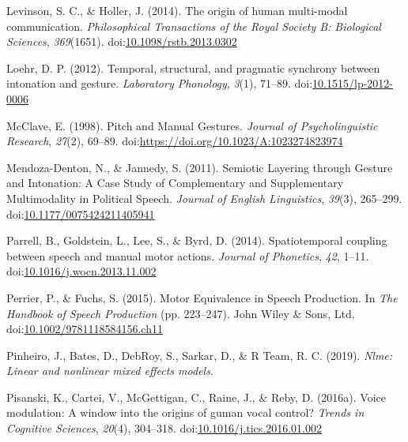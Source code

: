 \documentclass[
  man, noextraspace,floatsintext]{apa6}
\newlength{\cslhangindent}
\newenvironment{cslreferences}%
  {\setlength{\parindent}{0pt}%
  \everypar{\setlength{\hangindent}{\cslhangindent}}\ignorespaces}%
  {\par}
\begin{document}
\begin{cslreferences}
\leavevmode\hypertarget{ref-levinsonOriginHumanMultimodal2014}{}%
Levinson, S. C., \& Holler, J. (2014). The origin of human multi-modal communication. \emph{Philosophical Transactions of the Royal Society B: Biological Sciences}, \emph{369}(1651). doi:\href{https://doi.org/10.1098/rstb.2013.0302}{10.1098/rstb.2013.0302}

\leavevmode\hypertarget{ref-loehrTemporalStructuralPragmatic2012}{}%
Loehr, D. P. (2012). Temporal, structural, and pragmatic synchrony between intonation and gesture. \emph{Laboratory Phonology}, \emph{3}(1), 71--89. doi:\href{https://doi.org/10.1515/lp-2012-0006}{10.1515/lp-2012-0006}

\leavevmode\hypertarget{ref-mcclavePitchManualGestures1998}{}%
McClave, E. (1998). Pitch and Manual Gestures. \emph{Journal of Psycholinguistic Research}, \emph{27}(2), 69--89. doi:\href{https://doi.org/https://doi.org/10.1023/A:1023274823974}{https://doi.org/10.1023/A:1023274823974}

\leavevmode\hypertarget{ref-mendoza-dentonSemioticLayeringGesture2011}{}%
Mendoza-Denton, N., \& Jannedy, S. (2011). Semiotic Layering through Gesture and Intonation: A Case Study of Complementary and Supplementary Multimodality in Political Speech. \emph{Journal of English Linguistics}, \emph{39}(3), 265--299. doi:\href{https://doi.org/10.1177/0075424211405941}{10.1177/0075424211405941}

\leavevmode\hypertarget{ref-parrellSpatiotemporalCouplingSpeech2014}{}%
Parrell, B., Goldstein, L., Lee, S., \& Byrd, D. (2014). Spatiotemporal coupling between speech and manual motor actions. \emph{Journal of Phonetics}, \emph{42}, 1--11. doi:\href{https://doi.org/10.1016/j.wocn.2013.11.002}{10.1016/j.wocn.2013.11.002}

\leavevmode\hypertarget{ref-perrierMotorEquivalenceSpeech2015}{}%
Perrier, P., \& Fuchs, S. (2015). Motor Equivalence in Speech Production. In \emph{The Handbook of Speech Production} (pp. 223--247). John Wiley \& Sons, Ltd. doi:\href{https://doi.org/10.1002/9781118584156.ch11}{10.1002/9781118584156.ch11}

\leavevmode\hypertarget{ref-pinheiroNlmeLinearNonlinear2019}{}%
Pinheiro, J., Bates, D., DebRoy, S., Sarkar, D., \& R Team, R. C. (2019). \emph{Nlme: Linear and nonlinear mixed effects models}.

\leavevmode\hypertarget{ref-pisanskiVoiceModulationWindow2016}{}%
Pisanski, K., Cartei, V., McGettigan, C., Raine, J., \& Reby, D. (2016a). Voice modulation: A window into the origins of guman vocal control? \emph{Trends in Cognitive Sciences}, \emph{20}(4), 304--318. doi:\href{https://doi.org/10.1016/j.tics.2016.01.002}{10.1016/j.tics.2016.01.002}


\end{cslreferences}
\end{document}
